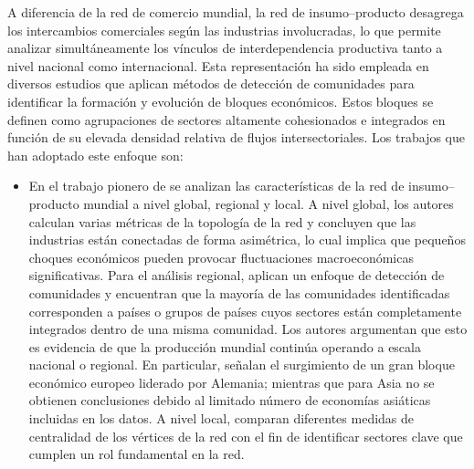 
A diferencia de la red de comercio mundial, la red de insumo--producto desagrega los intercambios comerciales según las industrias involucradas, lo que permite analizar simultáneamente los vínculos de interdependencia productiva tanto a nivel nacional como internacional. Esta representación ha sido empleada en diversos estudios que aplican métodos de detección de comunidades para identificar la formación y evolución de bloques económicos. Estos bloques se definen como agrupaciones de sectores altamente cohesionados e integrados en función de su elevada densidad relativa de flujos intersectoriales. Los trabajos que han adoptado  este enfoque son:
\begin{itemize}
	\item En el trabajo pionero de \textcite{Cerina2015} se analizan las características de la red de insumo--producto mundial a nivel global, regional y local. A nivel global, los autores calculan varias métricas de la topología de la red y concluyen que las industrias están conectadas de forma asimétrica, lo cual implica que pequeños choques económicos pueden provocar fluctuaciones macroeconómicas significativas. Para el análisis regional, aplican un enfoque de detección de comunidades y encuentran que la mayoría de las comunidades identificadas corresponden a países o grupos de países cuyos sectores están completamente integrados dentro de una misma comunidad. Los autores argumentan que esto es evidencia de que la producción mundial continúa operando a escala nacional o regional. En particular, señalan el surgimiento de un gran bloque económico europeo liderado por Alemania; mientras que para Asia no se obtienen conclusiones debido al limitado número de economías asiáticas incluidas en los datos. A nivel local, comparan diferentes medidas de centralidad de los vértices de la red con el fin de identificar sectores clave que cumplen un rol fundamental en la red. 
	

\end{itemize}
